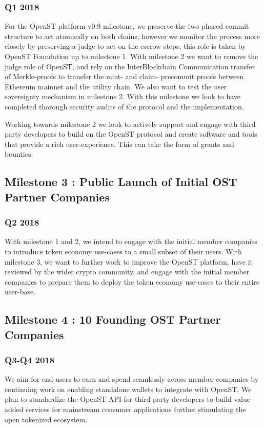 \documentclass[12pt,a4paper, twocolumn]{article}
\begin{document}
\subsubsection{Q1 2018}
For the OpenST platform v0.9 milestone, we preserve the two-phased commit structure to act atomically on both chains; however we monitor the process more closely by preserving a judge to act on the escrow steps; this role is taken by OpenST Foundation up to milestone 1.  With milestone 2 we want to remove the judge role of OpenST, and rely on the InterBlockchain Communication transfer of Merkle-proofs to transfer the mint- and claim- precommit proofs between Ethereum mainnet and the utility chain. We also want to test the user sovereignty mechanism in milestone 2.  With this milestone we look to have completed thorough security audits of the protocol and the implementation. \par

Working towards milestone 2 we look to actively support and engage with third party developers to build on the OpenST protocol and create software and tools that provide a rich user-experience.  This can take the form of grants and bounties. \par

\subsection{Milestone 3 : Public Launch of Initial OST Partner Companies}
\subsubsection{Q2 2018}
With milestone 1 and 2, we intend to engage with the initial member companies to introduce token economy use-cases to a small subset of their users. With milestone 3, we want to further work to improve the OpenST platform, have it reviewed by the wider crypto community, and engage with the initial member companies to prepare them to deploy the token economy use-cases to their entire user-base.


\subsection{Milestone 4 : 10 Founding OST Partner Companies}
\subsubsection{Q3-Q4 2018}
We aim for end-users to earn and spend seamlessly across member companies by continuing work on enabling standalone wallets to integrate with OpenST.  We plan to standardize the OpenST API for third-party developers to build value-added services for mainstream consumer applications further stimulating the open tokenized ecosystem.
\end{document}
